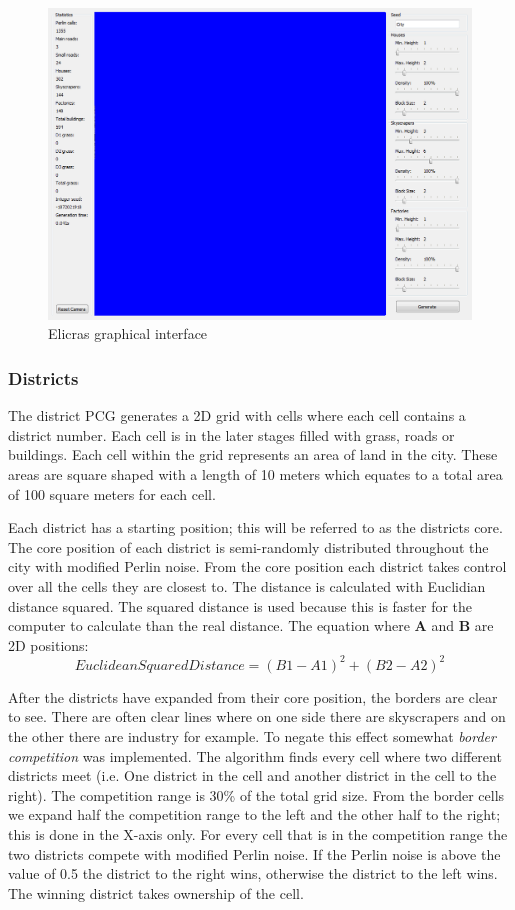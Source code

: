 		\begin{figure}[h]
			\centering
			\includegraphics[width=0.5\linewidth]{"Images/interface"}
			\caption{Elicras graphical interface}
			\label{fig:elicras-interface}
		\end{figure}
		
		\subsubsection{Districts}
		The district PCG generates a 2D grid with cells where each cell contains a district number. Each cell is in the later stages filled with grass, roads or buildings. Each cell within the grid represents an area of land in the city. These areas are square shaped with a length of 10 meters which equates to a total area of 100 square meters for each cell.
		
		\par
		Each district has a starting position; this will be referred to as the districts core. The core position of each district is semi-randomly distributed throughout the city with modified Perlin noise. From the core position each district takes control over all the cells they are closest to. The distance is calculated with Euclidian distance squared. The squared distance is used because this is faster for the computer to calculate than the real distance. The equation where \textbf{A} and \textbf{B} are 2D positions:
		\begin{equation}
			EuclideanSquaredDistance = (B1 - A1)^2 + (B2 - A2)^2
		\end{equation}
		
		\par
		After the districts have expanded from their core position, the borders are clear to see. There are often clear lines where on one side there are skyscrapers and on the other there are industry for example. To negate this effect somewhat \textit{border competition} was implemented. The algorithm finds every cell where two different districts meet (i.e. One district in the cell and another district in the cell to the right). The competition range is 30\% of the total grid size. From the border cells we expand half the competition range to the left and the other half to the right; this is done in the X-axis only. For every cell that is in the competition range the two districts compete with modified Perlin noise. If the Perlin noise is above the value of 0.5 the district to the right wins, otherwise the district to the left wins. The winning district takes ownership of the cell.
		
